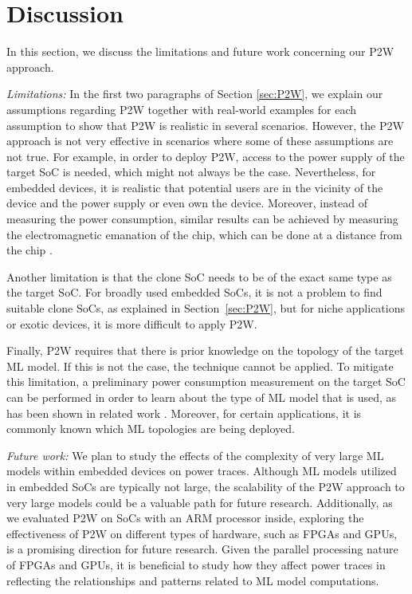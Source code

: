 \documentclass[letterpaper]{article}
\begin{document}
\section{Discussion}
\label{sec:discussion}
In this section, we discuss the limitations and future work concerning our P2W approach.

\textit{Limitations:} 
In the first two paragraphs of Section \ref{sec:P2W}, we explain our assumptions regarding P2W together with real-world examples for each assumption to show that P2W is realistic in several scenarios. However, the P2W approach is not very effective in scenarios where some of these assumptions are not true. For example, in order to deploy P2W, access to the power supply of the target SoC is needed, which might not always be the case. Nevertheless, for embedded devices, it is realistic that potential users are in the vicinity of the device and the power supply or even own the device. Moreover, instead of measuring the power consumption, similar results can be achieved by measuring the electromagnetic emanation of the chip, which can be done at a distance from the chip \cite{10.1007/3-540-48405-1_25}.

Another limitation is that the clone SoC needs to be of the exact same type as the target SoC. For broadly used embedded SoCs, it is not a problem to find suitable clone SoCs, as explained in Section~\ref{sec:P2W}, but for niche applications or exotic devices, it is more difficult to apply P2W.

Finally, P2W requires that there is prior knowledge on the topology of the target ML model. If this is not the case, the technique cannot be applied. To mitigate this limitation, a preliminary power consumption measurement on the target SoC can be performed in order to learn about the type of ML model that is used, as has been shown in related work \cite{10077551, 10.5555/3361338.3361374}. Moreover, for certain applications, it is commonly known which ML topologies are being deployed.

\textit{Future work:} 
We plan to study the effects of the complexity of very large ML models within embedded devices on power traces. Although ML models utilized in embedded SoCs are typically not large, the scalability of the P2W approach to very large models could be a valuable path for future research. Additionally, as we evaluated P2W on SoCs with an ARM processor inside, exploring the effectiveness of P2W on different types of hardware, such as FPGAs and GPUs, is a promising direction for future research. Given the parallel processing nature of FPGAs and GPUs, it is beneficial to study how they affect power traces in reflecting the relationships and patterns related to ML model computations.
\end{document}
